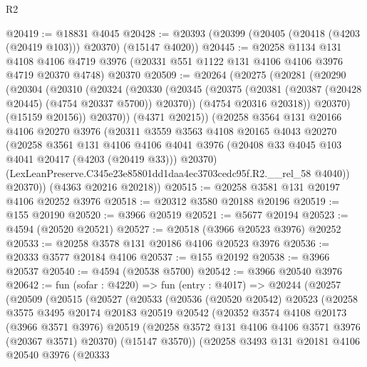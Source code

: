 \begin{lexlean}{R2}
\begin{coremodule}
@20419 := @18831 @4045
@20428 := @20393 (@20399 (@20405 (@20418 (@4203 (@20419 @103))) @20370) (@15147 @4020))
@20445 := @20258
    @1134
    @131
    @4108
    @4106
    @4719
    @3976
    (@20331 @551 @1122 @131 @4106 @4106 @3976 @4719 @20370 @4748)
    @20370
@20509 := @20264
    (@20275
      (@20281
        (@20290
          (@20304
            (@20310
              (@20324
                (@20330
                  (@20345
                    (@20375 (@20381 (@20387 (@20428 @20445) (@4754 @20337 @5700)) @20370))
                    (@4754 @20316 @20318))
                  @20370)
                (@15159 @20156))
              @20370))
          (@4371 @20215))
        (@20258
          @3564
          @131
          @20166
          @4106
          @20270
          @3976
          (@20311
            @3559
            @3563
            @4108
            @20165
            @4043
            @20270
            (@20258
              @3561
              @131
              @4106
              @4106
              @4041
              @3976
              (@20408 @33 @4045 @103 @4041 @20417 (@4203 (@20419 @33)))
              @20370)
            (LexLeanPreserve.C345e23e85801dd1daa4ec3703cedc95f.R2.__rel_58 @4040))
          @20370))
      (@4363 @20216 @20218))
@20515 := @20258 @3581 @131 @20197 @4106 @20252 @3976
@20518 := @20312 @3580 @20188 @20196
@20519 := @155 @20190
@20520 := @3966 @20519
@20521 := @5677 @20194
@20523 := @4594 (@20520 @20521)
@20527 := @20518 (@3966 @20523 @3976) @20252
@20533 := @20258 @3578 @131 @20186 @4106 @20523 @3976
@20536 := @20333 @3577 @20184 @4106
@20537 := @155 @20192
@20538 := @3966 @20537
@20540 := @4594 (@20538 @5700)
@20542 := @3966 @20540 @3976
@20642 := fun (sofar : @4220) =>
  fun (entry : @4017) =>
  @20244
    (@20257
      (@20509
        (@20515
          (@20527
            (@20533
              (@20536
                (@20520 @20542)
                @20523
                (@20258
                  @3575
                  @3495
                  @20174
                  @20183
                  @20519
                  @20542
                  (@20352
                    @3574
                    @4108
                    @20173
                    (@3966 @3571 @3976)
                    @20519
                    (@20258 @3572 @131 @4106 @4106 @3571 @3976 (@20367 @3571) @20370)
                    (@15147 @3570))
                  (@20258
                    @3493
                    @131
                    @20181
                    @4106
                    @20540
                    @3976
                    (@20333

\end{coremodule}
\end{lexlean}
